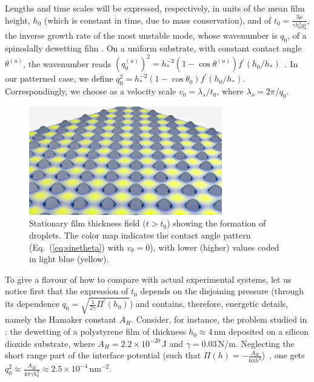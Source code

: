 Lengths and time scales will be expressed, respectively, in units of the mean film height, $h_0$ (which is constant in time, due to mass conservation), and of $t_0 = \frac{3\mu}{\gamma h_0^3 q_0^4}$, the inverse growth rate of the most unstable mode, whose wavenumber is $q_0$, of a spinodally dewetting film \cite{meckeThermalFluctuationsThin2005}. 
On a uniform substrate, with constant contact angle $\theta^{(u)}$, the wavenumber reads $(q^{(u)}_0)^2 = h_{\ast}^{-2}(1-\cos \theta^{(u)})f^{\prime}(h_0/h_{\ast})$~\cite{meckeThermalFluctuationsThin2005,zhangMolecularSimulationThin2019}. 
In our patterned case, we define $q_0^2=h_{\ast}^{-2}(1-\cos\theta_0)f^{\prime}(h_0/h_{\ast})$. 
Correspondingly, we choose as a velocity scale $v_0 = \lambda_s/t_0$, where $\lambda_s = 2\pi/q_0$.
\begin{figure}
    \centering
    \includegraphics[width=0.75\textwidth]{graphics/Figure_1.png}
    \caption{Stationary film thickness field ($t>t_0$) showing the formation of droplets. The color map indicates the contact angle pattern 
    (Eq.~(\ref{eq:sinetheta}) with $v_{\theta}=0$), with lower (higher) values coded in light blue (yellow).
    }
    \label{fig:handtheta}
\end{figure}
To give a flavour of how to compare with actual experimental systems, let us notice first that the expression of $t_0$ depends on the disjoining pressure (through its dependence $q_0 = \sqrt{\frac{1}{2\gamma} \Pi^{\prime}(h_0)}$) and contains, therefore, energetic details, namely the Hamaker constant $A_H$.
Consider, for instance, the problem studied in \cite{beckerComplexDewettingScenarios2003}: the dewetting of a polystyrene film of thickness $h_0 \approx 4 \, \text{nm}$ deposited on a silicon dioxide substrate, where $A_H  = 2.2 \times 10^{-20} \, \text{J}$ and $\gamma = 0.03 \, \text{N}/\text{m}$. 
Neglecting the short range part of the interface potential (such that $\Pi(h)= - \frac{A_H}{6\pi h^3}$)~\cite{meckeThermalFluctuationsThin2005,beckerComplexDewettingScenarios2003}, one gets $q_0^2 \approx \frac{A_H}{4\pi \gamma h_0^4} \approx 2.5 \times 10^{-4} \, \text{nm}^{-2}$.
